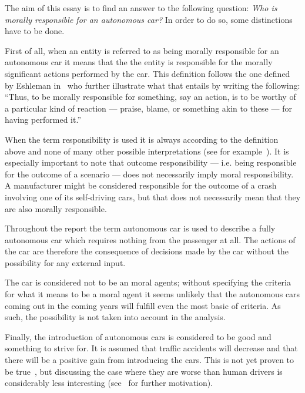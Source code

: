 The aim of this essay is to find an answer to the following question:
\textit{Who is morally responsible for an autonomous car?}
In order to do so, some distinctions have to be done.

First of all, when an entity is referred to as being morally responsible for an
autonomous car it means that the the entity is responsible for the morally
significant actions performed by the car. This definition follows the one
defined by Eshleman in~\cite{eshleman_2014_moral_mra} who further illustrate
what that entails by writing the following:
``Thus, to be morally responsible for something, say an action, is to be
worthy of a particular kind of reaction --- praise, blame, or something akin to
these --- for having performed it.''

When the term responsibility is used it is always according to the definition
above and none of many other possible interpretations (see for
example~\cite[Ch.2]{vincent_2011_moral_mr}). It is especially important to note
that outcome responsibility --- i.e. being responsible for the outcome of a
scenario --- does not necessarily imply moral responsibility. A manufacturer
might be considered responsible for the outcome of a crash involving one of its
self-driving cars, but that does not necessarily mean that they are also morally
responsible.

Throughout the report the term autonomous car is used to describe a fully
autonomous car which requires nothing from the passenger at all. The actions of
the car are therefore the consequence of decisions made by the car without the
possibility for any external input.

The car is considered not to be an moral agents; without specifying the criteria
for what it means to be a moral agent it seems unlikely that the autonomous cars
coming out in the coming years will fulfill even the most basic of criteria. As
such, the possibility is not taken into account in the analysis.

Finally, the introduction of autonomous cars is considered to be good
and something to strive for. It is assumed that traffic accidents will decrease
and that there will be a positive gain from introducing the cars. This is not
yet proven to be true~\cite{schoettle_2015_preliminary_apaorcisv}, but discussing
the case where they are worse than human drivers is considerably less
interesting (see~\cite{marchant_2012_coming_ccbavatlst} for further motivation).